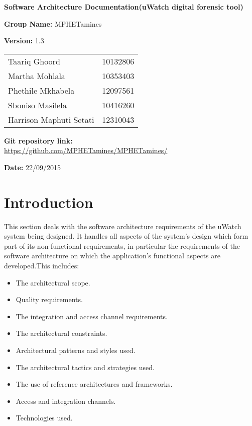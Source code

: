 \documentclass[a4paper,12pt]{article}
\begin{document}
\begin{center}

\Huge\textbf{Software Architecture Documentation(uWatch digital forensic tool)\\}
																											
\vspace{2 cm}

\LARGE\textbf{Group Name:} MPHETamines\newline
 
\LARGE\textbf{Version:} 1.3\newline
 
 
 
 
\vspace{0.5 cm}
\begin{tabular}{lr}
Taariq Ghoord&10132806
\\ 
Martha Mohlala&10353403
\\
Phethile Mkhabela&12097561
\\
Sboniso Masilela&10416260
\\
Harrison Maphuti Setati&12310043\\
\end{tabular}

\vspace{1cm}
\textbf{Git repository link:\\}
\url{https://github.com/MPHETamines/MPHETamines/}

\vspace{1cm}
\textbf{Date:} 22/09/2015
\end{center}
\newpage

\tableofcontents

\newpage
{}

\section{Introduction}
This section deals with the software architecture requirements of the uWatch
system being designed. It handles all aspects of the system's design which
form part of its non-functional requirements, in particular the requirements
of the software architecture on which the application's functional aspects are
developed.This includes:
\begin{itemize}
\item The architectural scope.
\item Quality requirements.
\item The integration and access channel requirements.
\item The architectural constraints.
\item Architectural patterns and styles used.
\item The architectural tactics and strategies used.
\item The use of reference architectures and frameworks.
\item Access and integration channels.
\item Technologies used.
\end{itemize}
\end{document}
